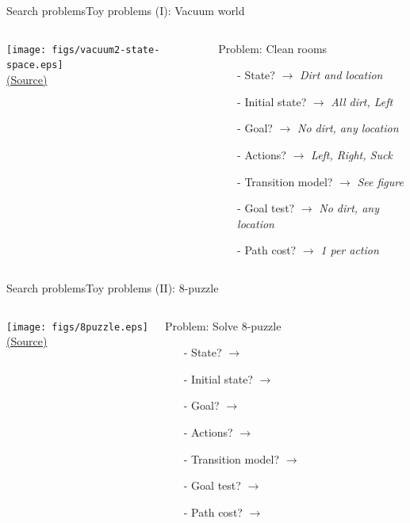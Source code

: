 \documentclass[10pt,compress]{beamer} %
\begin{document}
\begin{frame}[fragile]{Search problems}{Toy problems (I): Vacuum world}
       \begin{columns}
	           \centering 
               \texttt{[image: figs/vacuum2-state-space.eps]}\\
	           \tiny{\href{http://aima.cs.berkeley.edu/index.html}{(Source)}}

                \begin{exampleblock}{Problem: Clean rooms}
                    \begin{itemize}
                    \item[-] State? $\rightarrow$ \textit{Dirt and location}
                    \item[-] Initial state? $\rightarrow$ \textit{All dirt, Left}
                    \item[-] Goal? $\rightarrow$ \textit{No dirt, any location}
                    \item[-] Actions? $\rightarrow$ \textit{Left, Right, Suck}
                    \item[-] Transition model? $\rightarrow$ \textit{See figure}
                    \item[-] Goal test? $\rightarrow$ \textit{No dirt, any location}
                    \item[-] Path cost? $\rightarrow$ \textit{1 per action}
                    \end{itemize}
                \end{exampleblock}
      \end{columns}
\end{frame}

\begin{frame}{Search problems}{Toy problems (II): 8-puzzle}
       \begin{columns}
	            \centering \texttt{[image: figs/8puzzle.eps]}\\
	            \tiny{\href{http://aima.cs.berkeley.edu/index.html}{(Source)}}
                \begin{exampleblock}{Problem: Solve 8-puzzle}
                    \begin{itemize}
                    \item[-] State? $\rightarrow$ 
                    \item[-] Initial state? $\rightarrow$ 
                    \item[-] Goal? $\rightarrow$ 
                    \item[-] Actions? $\rightarrow$ 
                    \item[-] Transition model? $\rightarrow$ 
                    \item[-] Goal test? $\rightarrow$ 
                    \item[-] Path cost? $\rightarrow$
                    \end{itemize}
                \end{exampleblock}
      \end{columns}
\end{frame}
\end{document}
